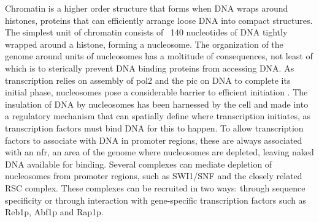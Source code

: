Chromatin is a higher order structure that forms when DNA wraps around histones, proteins that can efficiently arrange loose DNA into compact structures.
The simplest unit of chromatin consists of ~140 nucleotides of DNA tightly wrapped around a histone, forming a nucleosome.
The organization of the genome around units of nucleosomes has a moltitude of consequences, not least of which is to sterically prevent DNA binding proteins from accessing DNA. 
As transcription relies on assembly of \gls{pol2} and the \gls{pic} on DNA to complete its initial phase, nucleosomes pose a considerable barrier to efficient initiation \cite{field:2008:distinct} \cite{jiang:2009:compiled}.
The insulation of DNA by nucleosomes has been harnessed by the cell and made into a regulatory mechanism that can spatially define where transcription initiates, as transcription factors must bind DNA for this to happen. 
To allow transcription factors to associate with DNA in promoter regions, these are always associated with an \gls{nfr}, an area of the genome where nucleosomes are depleted, leaving naked DNA available for binding.
Several complexes can mediate depletion of nucleosomes from promoter regions, such as SWI1/SNF and the closely related RSC complex.
These complexes can be recruited in two ways: through sequence specificity or through interaction with gene-specific transcription factors such as Reb1p, Abf1p and Rap1p.

